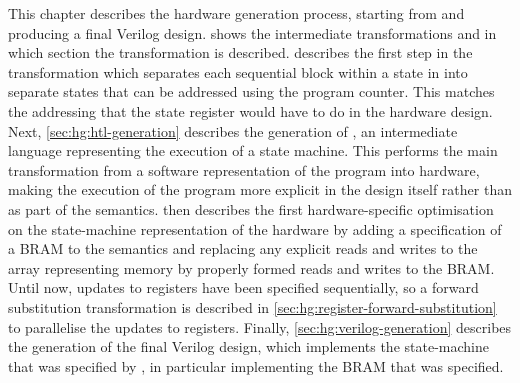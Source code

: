 This chapter describes the hardware generation process, starting from \rtlpar{}
and producing a final Verilog design.
 shows the intermediate
transformations and in which section the transformation is described.
 describes the first step in the
transformation which separates each sequential block within a state in \rtlpar{}
into separate states that can be addressed using the program counter.  This
matches the addressing that the state register would have to do in the hardware
design. Next, \cref{sec:hg:htl-generation} describes the generation of \htl{},
an intermediate language representing the execution of a state machine.  This
performs the main transformation from a software representation of the program
into hardware, making the execution of the program more explicit in the design
itself rather than as part of the semantics.   then
describes the first hardware-specific optimisation on the state-machine
representation of the hardware by adding a specification of a \gls{BRAM} to the
\htl{} semantics and replacing any explicit reads and writes to the array
representing memory by properly formed reads and writes to the \gls{BRAM}.
Until now, updates to registers have been specified sequentially, so a forward
substitution transformation is described in
\cref{sec:hg:register-forward-substitution} to parallelise the updates to
registers.  Finally, \cref{sec:hg:verilog-generation} describes the generation
of the final Verilog design, which implements the state-machine that was
specified by \htl{}, in particular implementing the \gls{BRAM} that was
specified.

